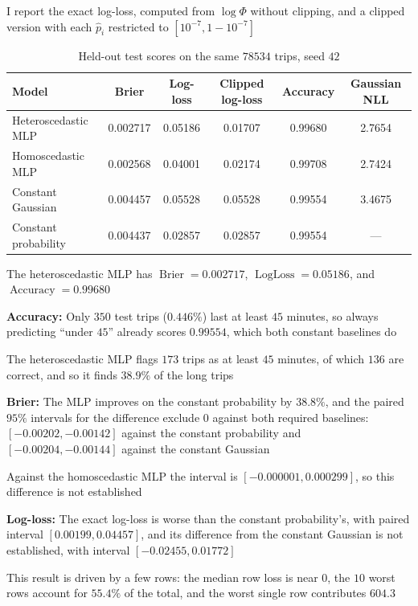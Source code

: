 \documentclass{article}
\begin{document}
\begin{enumerate}[label=\alph*.]
I report the exact log-loss, computed from $\log\Phi$ without clipping, and a clipped version with each $\hat p_i$ restricted to $[10^{-7},1-10^{-7}]$

\begin{table}[H]
\centering
\begin{tabular}{lccccc}
\toprule
Model & Brier & Log-loss & Clipped log-loss & Accuracy & Gaussian NLL \\
\midrule
Heteroscedastic MLP & 0.002717 & 0.05186 & 0.01707 & 0.99680 & 2.7654 \\
Homoscedastic MLP & 0.002568 & 0.04001 & 0.02174 & 0.99708 & 2.7424 \\
Constant Gaussian & 0.004457 & 0.05528 & 0.05528 & 0.99554 & 3.4675 \\
Constant probability & 0.004437 & 0.02857 & 0.02857 & 0.99554 & --- \\
\bottomrule
\end{tabular}
\caption{Held-out test scores on the same $78534$ trips, seed $42$}
\end{table}

The heteroscedastic MLP has $\boxed{\operatorname{Brier}=0.002717}$, $\boxed{\operatorname{LogLoss}=0.05186}$, and $\boxed{\operatorname{Accuracy}=0.99680}$

\textbf{Accuracy:} Only $350$ test trips ($0.446\%$) last at least $45$ minutes, so always predicting ``under $45$'' already scores $0.99554$, which both constant baselines do

The heteroscedastic MLP flags $173$ trips as at least $45$ minutes, of which $136$ are correct, and so it finds $38.9\%$ of the long trips

\textbf{Brier:} The MLP improves on the constant probability by $38.8\%$, and the paired $95\%$ intervals for the difference exclude $0$ against both required baselines: $[-0.00202,-0.00142]$ against the constant probability and $[-0.00204,-0.00144]$ against the constant Gaussian

Against the homoscedastic MLP the interval is $[-0.000001,0.000299]$, so this difference is not established

\textbf{Log-loss:} The exact log-loss is worse than the constant probability's, with paired interval $[0.00199,0.04457]$, and its difference from the constant Gaussian is not established, with interval $[-0.02455,0.01772]$

This result is driven by a few rows: the median row loss is near $0$, the $10$ worst rows account for $55.4\%$ of the total, and the worst single row contributes $604.3$


\end{enumerate}
\end{document}
